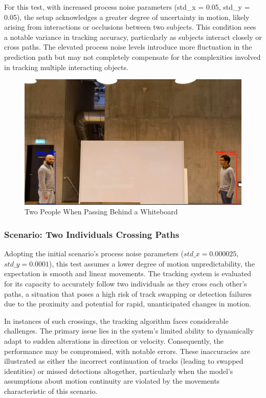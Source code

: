 \documentclass{article}
\begin{document}
For this test, with increased process noise parameters (std\_x = 0.05, std\_y = 0.05), the setup acknowledges a greater degree of uncertainty in motion, likely arising from interactions or occlusions between two subjects. This condition sees a notable variance in tracking accuracy, particularly as subjects interact closely or cross paths. The elevated process noise levels introduce more fluctuation in the prediction path but may not completely compensate for the complexities involved in tracking multiple interacting objects. 
\begin{figure}[H]
\centering
\includegraphics[width=0.5\linewidth]{two people passing whiteboard.png}
\caption{Two People When Passing Behind a Whiteboard}
\label{fig:two human passing}
\end{figure}

\subsubsection{Scenario: Two Individuals Crossing Paths}
Adopting the initial scenario's process noise parameters (\(std\_x = 0.000025\), \(std\_y = 0.0001\)), this test assumes a lower degree of motion unpredictability, the expectation is smooth and linear movements. The tracking system is evaluated for its capacity to accurately follow two individuals as they cross each other's paths, a situation that poses a high risk of track swapping or detection failures due to the proximity and potential for rapid, unanticipated changes in motion.

In instances of such crossings, the tracking algorithm faces considerable challenges. The primary issue lies in the system's limited ability to dynamically adapt to sudden alterations in direction or velocity. Consequently, the performance may be compromised, with notable errors. These inaccuracies are illustrated as either the incorrect continuation of tracks (leading to swapped identities) or missed detections altogether, particularly when the model's assumptions about motion continuity are violated by the movements characteristic of this scenario.
\end{document}
